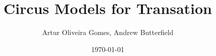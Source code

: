 \documentclass[10pt]{article}
\author{Artur Oliveira Gomes, Andrew Butterfield}
\title{Circus Models for Transation}
\date\today
\begin{document}
\maketitle
\tableofcontents
\pagebreak










\end{document}
